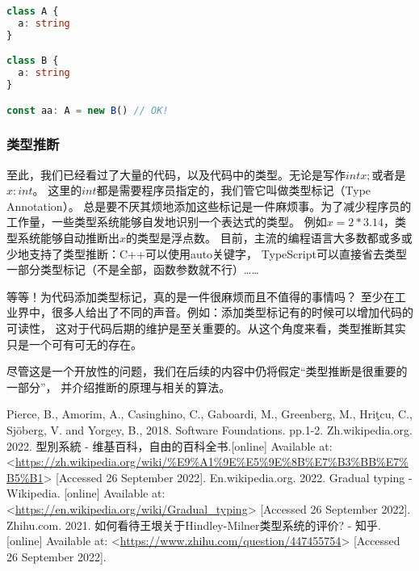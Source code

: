 \documentclass[../main.tex]{subfiles}
\begin{document}
\begin{lstlisting}[language=TypeScript]
class A {
  a: string
}

class B {
  a: string
}

const aa: A = new B() // OK!
\end{lstlisting}

  \subsubsection*{类型推断}
  \indent 至此，我们已经看过了大量的代码，以及代码中的类型。无论是写作$int x;$或者是$x: int$。
  这里的$int$都是需要程序员指定的，我们管它叫做类型标记（Type Annotation）。
  总是要不厌其烦地添加这些标记是一件麻烦事。为了减少程序员的工作量，一些类型系统能够自发地识别一个表达式的类型。
  例如$x = 2 * 3.14$，类型系统能够自动推断出$x$的类型是浮点数。
  目前，主流的编程语言大多数都或多或少地支持了类型推断：C++可以使用auto关键字，
  TypeScript可以直接省去类型一部分类型标记（不是全部，函数参数就不行）……

  \indent 等等！为代码添加类型标记，真的是一件很麻烦而且不值得的事情吗？
  至少在工业界中，很多人给出了不同的声音。例如：添加类型标记有的时候可以增加代码的可读性，
  这对于代码后期的维护是至关重要的。从这个角度来看，类型推断其实只是一个可有可无的存在。 \cite{zh}

  \indent 尽管这是一个开放性的问题，我们在后续的内容中仍将假定“类型推断是很重要的一部分”，
  并介绍推断的原理与相关的算法。

  \begin{thebibliography}{4}
     Pierce, B., Amorim, A., Casinghino, C., Gaboardi, M., Greenberg, M., Hriţcu, C., Sjöberg, V. and Yorgey, B., 2018. Software Foundations. pp.1-2.
     Zh.wikipedia.org. 2022. 型別系統 - 维基百科，自由的百科全书.[online] Available at: <\url{https://zh.wikipedia.org/wiki/%E9%A1%9E%E5%9E%8B%E7%B3%BB%E7%B5%B1}> [Accessed 26 September 2022].
     En.wikipedia.org. 2022. Gradual typing - Wikipedia. [online] Available at: <\url{https://en.wikipedia.org/wiki/Gradual_typing}> [Accessed 26 September 2022].
     Zhihu.com. 2021. 如何看待王垠关于Hindley-Milner类型系统的评价? - 知乎. [online] Available at: <\url{https://www.zhihu.com/question/447455754}> [Accessed 26 September 2022].
  \end{thebibliography}
\end{document}
